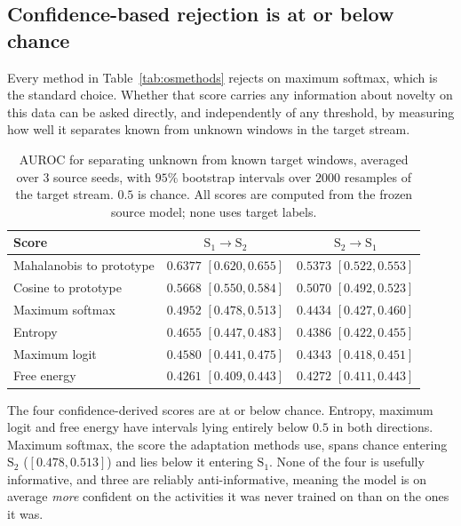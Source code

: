 \subsection{Confidence-based rejection is at or below chance}
\label{sec:os-detect}

Every method in Table~\ref{tab:osmethods} rejects on maximum softmax, which is the standard
choice. Whether that score carries any information about novelty on this data can be
asked directly, and independently of any threshold, by measuring how well it separates
known from unknown windows in the target stream.

\begin{table}[t]
\centering
\caption{AUROC for separating unknown from known target windows, averaged over 3 source
seeds, with $95\%$ bootstrap intervals over $2000$ resamples of the target stream.
$0.5$ is chance. All scores are computed from the frozen source model; none uses target
labels.}
\label{tab:osauroc}
\small
\begin{tabular}{@{}lcc@{}}
\toprule
Score & $\text{S}_1\!\to\!\text{S}_2$ & $\text{S}_2\!\to\!\text{S}_1$ \\
\midrule
Mahalanobis to prototype & $\mathbf{0.6377}$ $[0.620,0.655]$ & $\mathbf{0.5373}$ $[0.522,0.553]$ \\
Cosine to prototype      & $0.5668$ $[0.550,0.584]$ & $0.5070$ $[0.492,0.523]$ \\
\midrule
Maximum softmax          & $0.4952$ $[0.478,0.513]$ & $0.4434$ $[0.427,0.460]$ \\
Entropy                  & $0.4655$ $[0.447,0.483]$ & $0.4386$ $[0.422,0.455]$ \\
Maximum logit            & $0.4580$ $[0.441,0.475]$ & $0.4343$ $[0.418,0.451]$ \\
Free energy              & $0.4261$ $[0.409,0.443]$ & $0.4272$ $[0.411,0.443]$ \\
\bottomrule
\end{tabular}
\end{table}

The four confidence-derived scores are at or below chance. Entropy, maximum logit and free
energy have intervals lying entirely below $0.5$ in both directions. Maximum softmax, the
score the adaptation methods use, spans chance entering $\text{S}_2$
($[0.478,0.513]$) and lies below it entering $\text{S}_1$. None of the four is
usefully informative, and three are reliably anti-informative, meaning the model is on
average \emph{more} confident on the activities it was never trained on than on the ones it
was.

